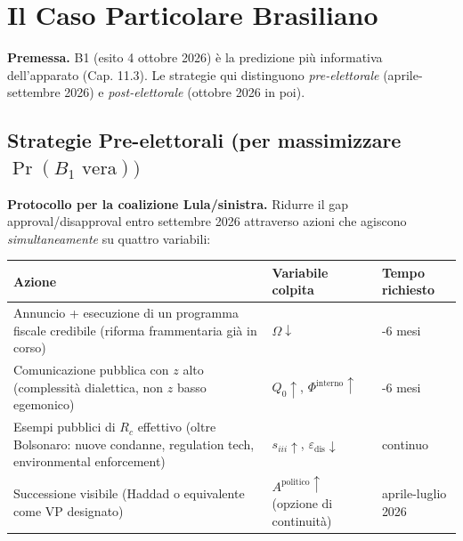 \section{Il Caso Particolare
Brasiliano}\label{il-caso-particolare-brasiliano}

\Hypoth{} \textbf{Premessa.} B1 (esito 4 ottobre 2026) è la predizione
più informativa dell'apparato (Cap. 11.3). Le strategie qui distinguono
\emph{pre-elettorale} (aprile-settembre 2026) e \emph{post-elettorale}
(ottobre 2026 in poi).

\subsection{\texorpdfstring{Strategie Pre-elettorali (per massimizzare
\(\Pr(B_1 \text{ vera}))\)}{Strategie Pre-elettorali (per massimizzare \textbackslash Pr(B\_1 \textbackslash text\{ vera\}))}}\label{strategie-pre-elettorali-per-massimizzare-prb_1-text-vera}

\Hypoth{} \textbf{Protocollo per la coalizione Lula/sinistra.} Ridurre
il gap approval/disapproval entro settembre 2026 attraverso azioni che
agiscono \emph{simultaneamente} su quattro variabili:

{\def\LTcaptype{none} %
{\small\begin{longtable}[]{@{}
  >{\raggedright\arraybackslash}p{}
  >{\raggedright\arraybackslash}p{}
  >{\raggedright\arraybackslash}p{}@{}}
\toprule\noalign{}
\begin{minipage}[b]{\linewidth}\raggedright
Azione
\end{minipage} & \begin{minipage}[b]{\linewidth}\raggedright
Variabile colpita
\end{minipage} & \begin{minipage}[b]{\linewidth}\raggedright
Tempo richiesto
\end{minipage} \\
\midrule\noalign{}
\endhead
\bottomrule\noalign{}
\endlastfoot
Annuncio + esecuzione di un programma fiscale credibile (riforma
frammentaria già in corso) & \(\Omega \downarrow\) & 4-6 mesi \\
Comunicazione pubblica con \(z\) alto (complessità dialettica, non \(z\)
basso egemonico) & \(Q_0 \uparrow\), \(\Phi^{\text{interno}} \uparrow\)
& 3-6 mesi \\
Esempi pubblici di \(R_c\) effettivo (oltre Bolsonaro: nuove condanne,
regulation tech, environmental enforcement) & \(s_{iii} \uparrow\),
\(\varepsilon_{\text{dis}} \downarrow\) & continuo \\
Successione visibile (Haddad o equivalente come VP designato) &
\(A^{\text{politico}} \uparrow\) (opzione di continuità) & aprile-luglio
2026 \\
\end{longtable}}
}

